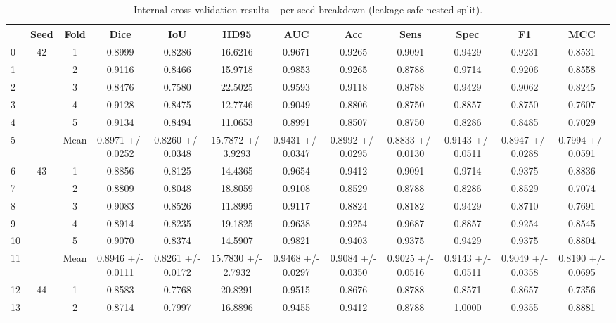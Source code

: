 \begin{table}[htbp]
  \centering
  \caption{Internal cross-validation results -- per-seed breakdown (leakage-safe nested split).}
  \label{tab:internal_cv_detailed}
  \begin{tabular}{lccccccccccc}
    \toprule
     & Seed & Fold & Dice & IoU & HD95 & AUC & Acc & Sens & Spec & F1 & MCC \\
    \midrule
    0 & 42 & 1 & 0.8999 & 0.8286 & 16.6216 & 0.9671 & 0.9265 & 0.9091 & 0.9429 & 0.9231 & 0.8531 \\
    1 &  & 2 & 0.9116 & 0.8466 & 15.9718 & 0.9853 & 0.9265 & 0.8788 & 0.9714 & 0.9206 & 0.8558 \\
    2 &  & 3 & 0.8476 & 0.7580 & 22.5025 & 0.9593 & 0.9118 & 0.8788 & 0.9429 & 0.9062 & 0.8245 \\
    3 &  & 4 & 0.9128 & 0.8475 & 12.7746 & 0.9049 & 0.8806 & 0.8750 & 0.8857 & 0.8750 & 0.7607 \\
    4 &  & 5 & 0.9134 & 0.8494 & 11.0653 & 0.8991 & 0.8507 & 0.8750 & 0.8286 & 0.8485 & 0.7029 \\
    5 &  & Mean & 0.8971 +/- 0.0252 & 0.8260 +/- 0.0348 & 15.7872 +/- 3.9293 & 0.9431 +/- 0.0347 & 0.8992 +/- 0.0295 & 0.8833 +/- 0.0130 & 0.9143 +/- 0.0511 & 0.8947 +/- 0.0288 & 0.7994 +/- 0.0591 \\
    \cmidrule(lr){1-12}
    6 & 43 & 1 & 0.8856 & 0.8125 & 14.4365 & 0.9654 & 0.9412 & 0.9091 & 0.9714 & 0.9375 & 0.8836 \\
    7 &  & 2 & 0.8809 & 0.8048 & 18.8059 & 0.9108 & 0.8529 & 0.8788 & 0.8286 & 0.8529 & 0.7074 \\
    8 &  & 3 & 0.9083 & 0.8526 & 11.8995 & 0.9117 & 0.8824 & 0.8182 & 0.9429 & 0.8710 & 0.7691 \\
    9 &  & 4 & 0.8914 & 0.8235 & 19.1825 & 0.9638 & 0.9254 & 0.9687 & 0.8857 & 0.9254 & 0.8545 \\
    10 &  & 5 & 0.9070 & 0.8374 & 14.5907 & 0.9821 & 0.9403 & 0.9375 & 0.9429 & 0.9375 & 0.8804 \\
    11 &  & Mean & 0.8946 +/- 0.0111 & 0.8261 +/- 0.0172 & 15.7830 +/- 2.7932 & 0.9468 +/- 0.0297 & 0.9084 +/- 0.0350 & 0.9025 +/- 0.0516 & 0.9143 +/- 0.0511 & 0.9049 +/- 0.0358 & 0.8190 +/- 0.0695 \\
    \cmidrule(lr){1-12}
    12 & 44 & 1 & 0.8583 & 0.7768 & 20.8291 & 0.9515 & 0.8676 & 0.8788 & 0.8571 & 0.8657 & 0.7356 \\
    13 &  & 2 & 0.8714 & 0.7997 & 16.8896 & 0.9455 & 0.9412 & 0.8788 & 1.0000 & 0.9355 & 0.8881 \\

\end{tabular}
\end{table}
